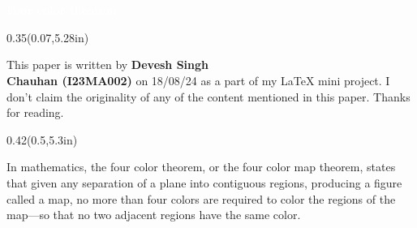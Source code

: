 \documentclass[11pt,a4paper,twoside]{book}
\newenvironment{positionedparagraph}[4]{%
	\begin{textblock*}{#1}(#2,#3)
		\noindent\textbf{#4}\par\medskip
	}{%
	\end{textblock*}
}
\begin{document}
\begin{tcolorbox}[colback=blue!48, colframe=blue!48, width=\linewidth, boxrule=0pt, arc=0pt, outer arc=0pt, sharp corners] \textcolor{white}{\textbf{\\ \\  \Huge Four color theorem \\}}
\end{tcolorbox}

\begin{center}
\end{center}

\begin{positionedparagraph}{0.35\textwidth}{0.07\textwidth}{5.28in}{ \\[-10mm]
\tcbox[colback=blue!48,right=50pt, top=7pt, bottom=7pt, boxrule=0mm, arc=0mm]{\textcolor{white}{\Large Abstract \, \, \, \, \, \, \, \, \,}}}
\noindent This paper is written by \textbf {Devesh Singh \\ Chauhan (I23MA002) }on 18/08/24 as a part of my LaTeX mini project. I don't claim the originality of any of the content mentioned in this paper. Thanks for reading.
\end{positionedparagraph}

\begin{positionedparagraph}{0.42\textwidth}{0.5\textwidth}{5.3in}{ \\[-13.12mm]
\tcbox[colback=blue!48,top=11pt, bottom=11pt, right=100pt, boxrule=0mm, arc=0mm]{\textcolor{white}{\Large Introduction \, \, \,\,\, \,}}}
In mathematics, the four color theorem, or the four color map theorem, states that given any separation of a plane into contiguous regions, producing a figure called a map, no more than four colors are required to color the regions of the map—so that no two adjacent regions have the same color.
\end{positionedparagraph}
\end{document}
